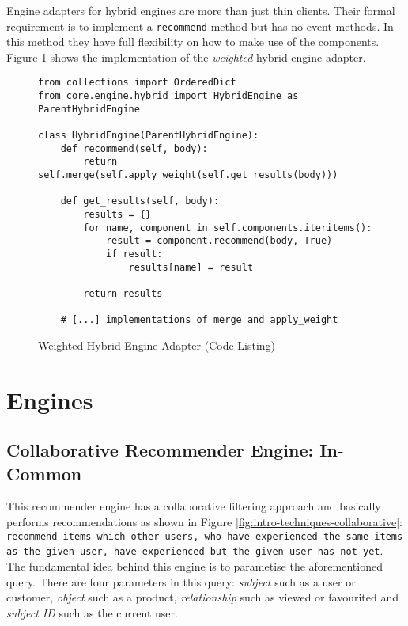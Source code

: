 Engine adapters for hybrid engines are more than just thin clients. Their formal requirement is to implement a \texttt{recommend} method but has no event methods. In this method they have full flexibility on how to make use of the components. Figure \ref{fig:implementation-framework-hybrid-engine-adapter} shows the implementation of the \emph{weighted} hybrid engine adapter.

\begin{figure}[!ht]
    \begin{verbatim}
from collections import OrderedDict
from core.engine.hybrid import HybridEngine as ParentHybridEngine

class HybridEngine(ParentHybridEngine):
    def recommend(self, body):
        return self.merge(self.apply_weight(self.get_results(body)))

    def get_results(self, body):
        results = {}
        for name, component in self.components.iteritems():
            result = component.recommend(body, True)
            if result:
                results[name] = result

        return results

    # [...] implementations of merge and apply_weight
    \end{verbatim}
    \caption{Weighted Hybrid Engine Adapter (Code Listing)}
    \label{fig:implementation-framework-hybrid-engine-adapter}
\end{figure}



\section{Engines}

\subsection{Collaborative Recommender Engine: In-Common}

This recommender engine has a collaborative filtering approach and basically performs recommendations as shown in Figure \ref{fig:intro-techniques-collaborative}: \texttt{recommend items which other users, who have experienced the same items as the given user, have experienced but the given user has not yet}. The fundamental idea behind this engine is to parametise the aforementioned query. There are four parameters in this query: \emph{subject} such as a user or customer, \emph{object} such as a product, \emph{relationship} such as viewed or favourited and \emph{subject ID} such as the current user.


